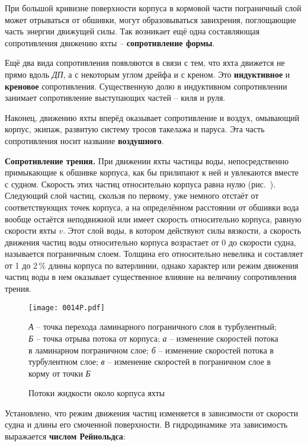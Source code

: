 При большой кривизне поверхности корпуса в кормовой части пограничный
слой может отрываться от обшивки, могут образовываться завихрения,
поглощающие часть энергии движущей силы. Так возникает ещё одна
составляющая сопротивления движению яхты \--- \textbf{сопротивление
  формы}.

Ещё два вида сопротивления появляются в связи с тем, что яхта движется
не прямо вдоль \textit{ДП}, а с некоторым углом дрейфа и с креном. Это
\textbf{индуктивное} и
\textbf{креновое} сопротивления. Существенную
долю в индуктивном сопротивлении занимает сопротивление выступающих
частей \--- киля и руля.

Наконец, движению яхты вперёд оказывает сопротивление и воздух,
омывающий корпус, экипаж, развитую систему тросов такелажа и
паруса. Эта часть сопротивления носит название \textbf{воздушного}.

\textbf{Сопротивление трения.} При
движении яхты частицы воды, непосредственно примыкающие к обшивке
корпуса, как бы прилипают к ней и увлекаются вместе с судном. Скорость
этих частиц относительно корпуса равна нулю (рис.~). Следующий
слой частиц, скользя по первому, уже немного отстаёт от
соответствующих точек корпуса, а на определённом расстоянии от обшивки
вода вообще остаётся неподвижной или имеет скорость относительно
корпуса, равную скорости яхты $v$. Этот слой воды, в котором действуют
силы вязкости, а скорость движения частиц воды относительно корпуса
возрастает от 0 до скорости судна, называется пограничным
слоем. Толщина его относительно невелика и составляет от 1 до 2\,\%
длины корпуса по ватерлинии, однако характер или режим движения частиц
воды в нем оказывает существенное влияние на величину сопротивления
трения.

\begin{figure*}[htb]
  \centering
  \texttt{[image: 0014P.pdf]}
  \caption{Потоки жидкости около корпуса яхты}
  \label{fig:14}
  \small
  \centering{}
  \textit{А} \--- точка перехода ламинарного пограничного слоя в турбулентный; \textit{Б} \--- точка отрыва потока от корпуса; \textit{а} \--- изменение скоростей потока в ламинарном пограничном слое; \textit{б} \--- изменение скоростей потока в турбулентном слое; \textit{в} \--- изменение скоростей в пограничном слое в корму от точки \textit{Б}
\end{figure*}

Установлено, что режим движения частиц изменяется в зависимости от
скорости судна и длины его смоченной поверхности. В гидродинамике эта
зависимость выражается \textbf{числом
Рейнольдса}:

